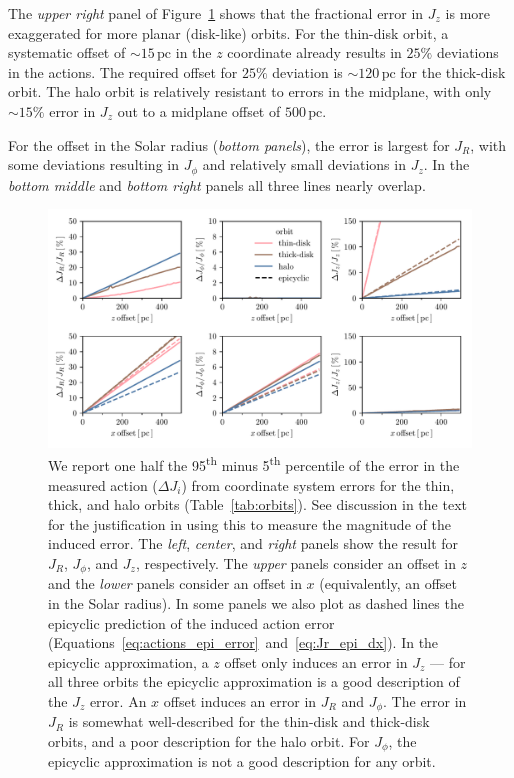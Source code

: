 \documentclass[twocolumn]{aastex62}
\newcommand{\pc}{\text{pc}}
\newcommand{\uth}{\textsuperscript{th}}
\begin{document}
The {\em upper right} panel of Figure~\ref{fig:many_orbit_wrong_ref} shows
that the fractional error in $J_z$ is more exaggerated for more planar
(disk-like) orbits. For the thin-disk orbit, a systematic offset of
$\sim15\,\pc$ in the $z$ coordinate already results in $25\%$ deviations in
the actions. The required offset for $25\%$ deviation is $\sim120\,\pc$ for
the thick-disk orbit. The halo orbit is relatively resistant to errors in the
midplane, with only $\sim15\%$ error in $J_z$ out to a midplane offset of
$500\,\pc$.

For the offset in the Solar radius ({\em bottom panels}), the error is largest
for $J_R$, with some deviations resulting in $J_{\phi}$ and relatively small
deviations in $J_z$. In the {\em bottom middle} and {\em bottom right} panels
all three lines nearly overlap.

\begin{figure}
\begin{center}
\includegraphics[width=\textwidth]{fig/schmactions_many_orbits.pdf}
\end{center}
\caption{We report one half the 95\uth{} minus 5\uth{} percentile of the error
in the measured action ($\Delta J_i$) from coordinate system errors for the
thin, thick, and halo orbits (Table~\ref{tab:orbits}). See discussion in the
text for the justification in using this to measure the magnitude of the
induced error. The {\em left}, {\em center}, and {\em right} panels show the
result for $J_R$, $J_{\phi}$, and $J_z$, respectively. The {\em upper} panels
consider an offset in $z$ and the {\em lower} panels consider an offset in $x$
(equivalently, an offset in the Solar radius). In some panels we also plot as
dashed lines the epicyclic prediction of the induced action error
(Equations~\ref{eq:actions_epi_error}~and~\ref{eq:Jr_epi_dx}). In the
epicyclic approximation, a $z$ offset only induces an error in $J_z$ --- for
all three orbits the epicyclic approximation is a good description of the
$J_z$ error. An $x$ offset induces an error in $J_R$ and $J_{\phi}$. The error in
$J_R$ is somewhat well-described for the thin-disk and thick-disk orbits, and
a poor description for the halo orbit. For $J_{\phi}$, the epicyclic approximation
is not a good description for any orbit.}
\label{fig:many_orbit_wrong_ref}
\end{figure}
\end{document}
